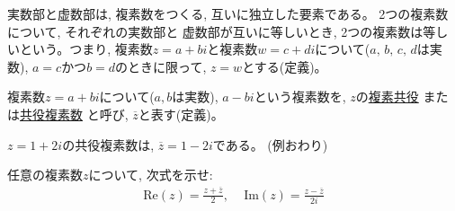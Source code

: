 

実数部と虚数部は, 複素数をつくる, 互いに独立した要素である。
2つの複素数について, それぞれの実数部と
虚数部が互いに等しいとき, 2つの複素数は等しいという。つまり, 
複素数$z=a+bi$と複素数$w=c+di$について($a,\,b,\,c,\,d$は実数), 
$a=c$かつ$b=d$のときに限って, $z=w$とする(定義)。\hv

複素数$z=a+bi$について($a, b$は実数), $a-bi$という複素数を, 
$z$の\underline{複素共役}
または\underline{共役複素数}
と呼び, $\overline{z}$と表す(定義)。\mv

\begin{exmpl}
$z=1+2i$の共役複素数は, $\overline{z}=1-2i$である。
(例おわり)\end{exmpl}\mv

\begin{q}\label{q:alg_comp1}
 任意の複素数$z$について, 次式を示せ:
\begin{eqnarray}
\text{Re}(z)=\frac{z+\overline{z}}{2},\,\,\,\,\,\,\,\text{Im}(z)=\frac{z-\overline{z}}{2i}\label{eq:univ_comp_ReIm}
\end{eqnarray}
\end{q}
\hv


